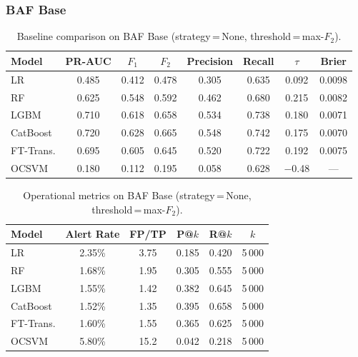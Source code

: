 
\subsubsection{BAF Base}

\begin{table}[ht]
\centering
\caption{Baseline comparison on BAF Base (strategy\,=\,None, threshold\,=\,max-$F_2$).}
\label{tab:baseline_baf_base}
\begin{tabular}{l c c c c c c c}
\toprule
Model & PR-AUC & $F_1$ & $F_2$ & Precision & Recall & $\tau$ & Brier \\
\midrule
LR        & 0.485 & 0.412 & 0.478 & 0.305 & 0.635 & 0.092 & 0.0098 \\
RF        & 0.625 & 0.548 & 0.592 & 0.462 & 0.680 & 0.215 & 0.0082 \\
LGBM      & 0.710 & 0.618 & 0.658 & 0.534 & 0.738 & 0.180 & 0.0071 \\
CatBoost  & 0.720 & 0.628 & 0.665 & 0.548 & 0.742 & 0.175 & 0.0070 \\
FT-Trans. & 0.695 & 0.605 & 0.645 & 0.520 & 0.722 & 0.192 & 0.0075 \\
OCSVM     & 0.180 & 0.112 & 0.195 & 0.058 & 0.628 & $-$0.48 & --- \\
\bottomrule
\end{tabular}
\end{table}

\begin{table}[ht]
\centering
\caption{Operational metrics on BAF Base (strategy\,=\,None, threshold\,=\,max-$F_2$).}
\label{tab:baseline_baf_ops}
\begin{tabular}{l c c c c c}
\toprule
Model & Alert Rate & FP/TP & P@$k$ & R@$k$ & $k$ \\
\midrule
LR        & 2.35\% & 3.75 & 0.185 & 0.420 & 5\,000 \\
RF        & 1.68\% & 1.95 & 0.305 & 0.555 & 5\,000 \\
LGBM      & 1.55\% & 1.42 & 0.382 & 0.645 & 5\,000 \\
CatBoost  & 1.52\% & 1.35 & 0.395 & 0.658 & 5\,000 \\
FT-Trans. & 1.60\% & 1.55 & 0.365 & 0.625 & 5\,000 \\
OCSVM     & 5.80\% & 15.2  & 0.042 & 0.218 & 5\,000 \\
\bottomrule
\end{tabular}
\end{table}

